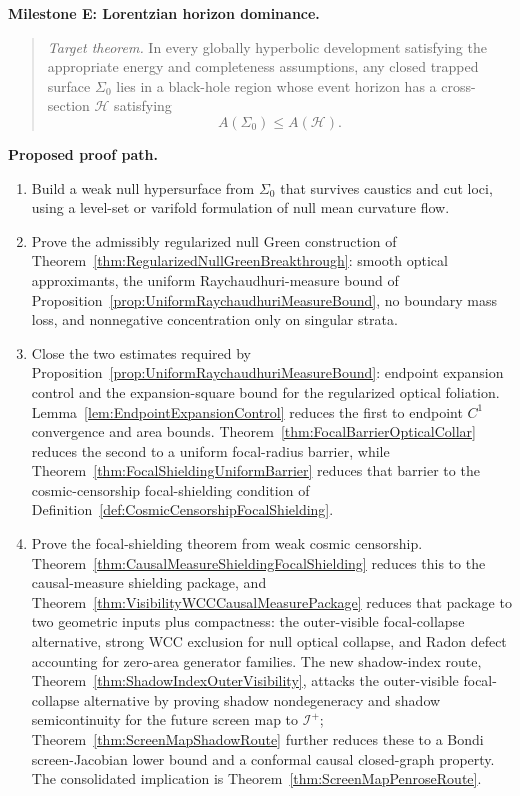 \textbf{Milestone E: Lorentzian horizon dominance.}
\begin{quote}
\emph{Target theorem.} In every globally hyperbolic development satisfying the appropriate energy and completeness assumptions, any closed trapped surface $\Sigma_0$ lies in a black-hole region whose event horizon has a cross-section $\mathcal H$ satisfying
\[
    A(\Sigma_0)\le A(\mathcal H).
\]
\end{quote}

\textbf{Proposed proof path.}
\begin{enumerate}
    \item Build a weak null hypersurface from $\Sigma_0$ that survives caustics and cut loci, using a level-set or varifold formulation of null mean curvature flow.
    \item Prove the admissibly regularized null Green construction of Theorem~\ref{thm:RegularizedNullGreenBreakthrough}: smooth optical approximants, the uniform Raychaudhuri-measure bound of Proposition~\ref{prop:UniformRaychaudhuriMeasureBound}, no boundary mass loss, and nonnegative concentration only on singular strata.
    \item Close the two estimates required by Proposition~\ref{prop:UniformRaychaudhuriMeasureBound}: endpoint expansion control and the expansion-square bound for the regularized optical foliation. Lemma~\ref{lem:EndpointExpansionControl} reduces the first to endpoint $C^1$ convergence and area bounds. Theorem~\ref{thm:FocalBarrierOpticalCollar} reduces the second to a uniform focal-radius barrier, while Theorem~\ref{thm:FocalShieldingUniformBarrier} reduces that barrier to the cosmic-censorship focal-shielding condition of Definition~\ref{def:CosmicCensorshipFocalShielding}.
    \item Prove the focal-shielding theorem from weak cosmic censorship. Theorem~\ref{thm:CausalMeasureShieldingFocalShielding} reduces this to the causal-measure shielding package, and Theorem~\ref{thm:VisibilityWCCCausalMeasurePackage} reduces that package to two geometric inputs plus compactness: the outer-visible focal-collapse alternative, strong WCC exclusion for null optical collapse, and Radon defect accounting for zero-area generator families. The new shadow-index route, Theorem~\ref{thm:ShadowIndexOuterVisibility}, attacks the outer-visible focal-collapse alternative by proving shadow nondegeneracy and shadow semicontinuity for the future screen map to $\mathscr I^+$; Theorem~\ref{thm:ScreenMapShadowRoute} further reduces these to a Bondi screen-Jacobian lower bound and a conformal causal closed-graph property. The consolidated implication is Theorem~\ref{thm:ScreenMapPenroseRoute}.

\end{enumerate}
